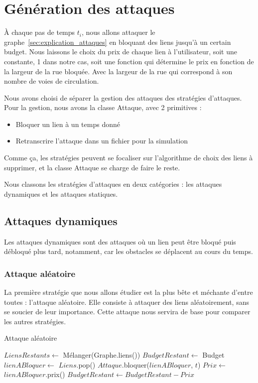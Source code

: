 \section{Génération des attaques}\label{sec:attaques}

\`A chaque pas de temps ${t_{i}}$, nous allons attaquer le graphe~\ref{sec:explication_attaques} en bloquant des liens jusqu'à un certain budget.
Nous laissons le choix du prix de chaque lien à l'utilisateur, soit une constante, 1 dans notre cas, soit une fonction qui détermine le prix en fonction de la largeur de la rue bloquée.
Avec la largeur de la rue qui correspond à son nombre de voies de circulation.

Nous avons choisi de séparer la gestion des attaques des stratégies d'attaques.
Pour la gestion, nous avons la classe Attaque, avec 2 primitives :
\begin{itemize}
\item Bloquer un lien à un temps donné
\item Retranscrire l'attaque dans un fichier pour la simulation
\end{itemize}
Comme ça, les stratégies peuvent se focaliser sur l'algorithme de choix des liens à supprimer, et la classe Attaque se charge de faire le reste.

Nous classons les stratégies d'attaques en deux catégories : les attaques dynamiques et les attaques statiques.

\subsection{Attaques dynamiques}\label{subsec:attaques_dynamiques}

Les attaques dynamiques sont des attaques où un lien peut être bloqué puis débloqué plus tard, notamment, car les obstacles se déplacent au cours du temps.

\subsubsection{Attaque aléatoire}\label{subsubsec:attaque_aleatoire}

La première stratégie que nous allons étudier est la plus bête et méchante d'entre toutes : l'attaque aléatoire.
Elle consiste à attaquer des liens aléatoirement, sans se soucier de leur importance.
Cette attaque nous servira de base pour comparer les autres stratégies.
\begin{algorithm}[H]
\caption{Attaque aléatoire}
\begin{algorithmic}
        \State $LiensRestants \gets$ Mélanger(Graphe.liens())
        \State $BudgetRestant \gets$ Budget
            \State $lienABloquer \gets$ $Liens$.pop()
            \State $Attaque$.bloquer($lienABloquer$, $t$)
            \State $Prix \gets$ $lienABloquer$.prix()
            \State $BudgetRestant \gets BudgetRestant - Prix$
        \EndWhile
    \EndFor
\end{algorithmic}
\end{algorithm}

